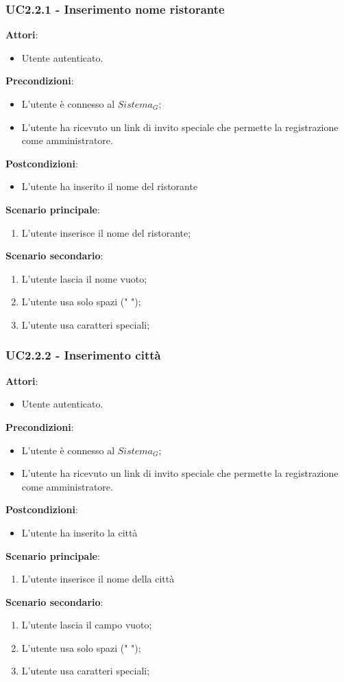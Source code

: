 \subsubsection{UC2.2.1 - Inserimento nome ristorante}
\textbf{Attori}:
\begin{itemize}
    \item Utente autenticato.
\end{itemize}
\textbf{Precondizioni}:
\begin{itemize}
    \item L'utente è connesso al $\textit{Sistema}_G$;
    \item L'utente ha ricevuto un link di invito speciale che permette la registrazione come amministratore.
\end{itemize}
\textbf{Postcondizioni}:
\begin{itemize}
    \item L'utente ha inserito il nome del ristorante
\end{itemize}
\textbf{Scenario principale}:
\begin{enumerate}
    \item L'utente inserisce il nome del ristorante;
\end{enumerate}
\textbf{Scenario secondario}:
\begin{enumerate}
    \item L'utente lascia il nome vuoto;
    \item L'utente usa solo spazi (" ");
    \item L'utente usa caratteri speciali;
\end{enumerate}
\subsubsection{UC2.2.2 - Inserimento città}
\textbf{Attori}:
\begin{itemize}
    \item Utente autenticato.
\end{itemize}
\textbf{Precondizioni}:
\begin{itemize}
    \item L'utente è connesso al $\textit{Sistema}_G$;
    \item L'utente ha ricevuto un link di invito speciale che permette la registrazione come amministratore.
\end{itemize}
\textbf{Postcondizioni}:
\begin{itemize}
    \item L'utente ha inserito la città
\end{itemize}
\textbf{Scenario principale}:
\begin{enumerate}
    \item L'utente inserisce il nome della città
\end{enumerate}
\textbf{Scenario secondario}:
\begin{enumerate}
    \item L'utente lascia il campo vuoto;
    \item L'utente usa solo spazi (" ");
    \item L'utente usa caratteri speciali;
\end{enumerate}
